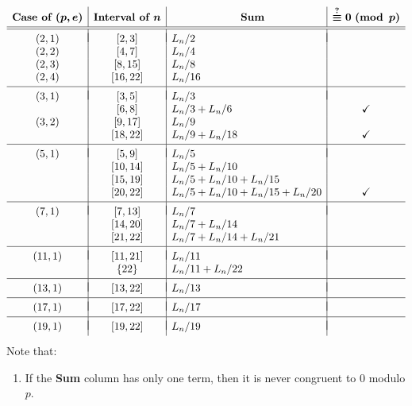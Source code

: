 \begin{enumerate}
 \[\begin{array}{c|c|l|c}  \textbf{Case of }\boldsymbol{(p,e)} & \textbf{Interval of }\boldsymbol{n} & \hspace{22.75mm}\textbf{Sum} & \boldsymbol{\stackrel{?}{\equiv}0\ (\operatorname{mod} \ p)} \\ [0.5ex] \hline\hline  & & & \\ [-2ex] (2,1) & [2,3] & L_n/2 &  \\      (2,2) & [4,7] & L_n/4 &  \\     (2,3) & [8,15] & L_n/8 & \\     (2,4) & [16,22] & L_n/16 &  \\ [0.5ex] \hline   & & & \\ [-2ex] (3,1) & [3,5] & L_n/3 & \\     & [6,8] & L_n/3 + L_n/6 & \checkmark \\    (3,2) & [9,17] & L_n/9 & \\  & [18,22] & L_n/9 + L_n/18 & \checkmark \\ [0.5ex] \hline   & & & \\ [-2ex] (5,1) & [5,9] & L_n/5 & \\     & [10,14] & L_n/5 + L_n/10 & \\ & [15,19] & L_n/5 + L_n/10 + L_n/15 & \\   & [20,22] & L_n/5 + L_n/10 + L_n/15 + L_n/20 & \checkmark \\ [0.5ex] \hline   & & & \\ [-2ex] (7,1) & [7,13] & L_n/7 & \\     & [14,20] & L_n/7 + L_n/14 & \\ & [21,22] & L_n/7 + L_n/14 + L_n/21 & \\ [0.5ex] \hline   & & & \\ [-2ex] (11,1) & [11,21] & L_n/11 &  \\ & \{22\} & L_n/11 + L_n/22 & \\ [0.5ex] \hline & & & \\ [-2ex] (13,1) & [13,22] & L_n/13 &  \\ [0.5ex] \hline & & & \\ [-2ex] (17,1) & [17,22] & L_n/17 &  \\ [0.5ex] \hline & & & \\ [-2ex] (19,1) & [19,22] & L_n/19 & \\ [0.5ex] \end{array}\]Note that:

 
            \begin{enumerate} 
        \item If the \textbf{Sum} column has only one term, then it is never congruent to $0$ modulo $p.$


\end{enumerate}
\end{enumerate}
